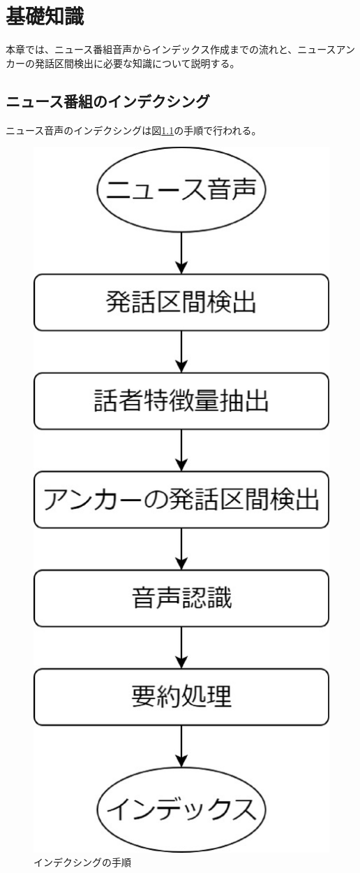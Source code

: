 \chapter{基礎知識}
本章では、ニュース番組音声からインデックス作成までの流れと、ニュースアンカーの発話区間検出に必要な知識について説明する。
\section{ニュース番組のインデクシング\cite{indexing_flow}}
ニュース音声のインデクシングは図\ref{fig:indexing}の手順で行われる。

\begin{figure}[H]
  \begin{center}
    \includegraphics[scale=0.3]{./figure/indexing.eps}
  \end{center}
  \caption{インデクシングの手順 \label{fig:indexing}}
\end{figure}

